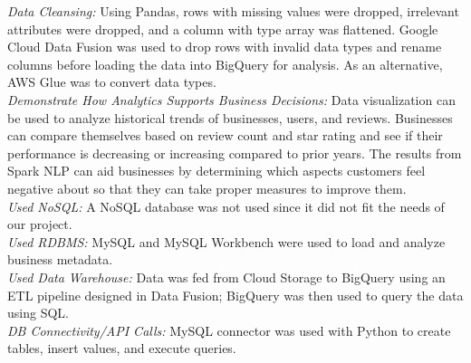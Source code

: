 \documentclass[11pt,journal,compsoc]{IEEEtran}
\begin{document}
\textit{Data Cleansing:} Using Pandas, rows with missing values were dropped, irrelevant attributes were dropped, and a column with type array was flattened. Google Cloud Data Fusion was used to drop rows with invalid data types and rename columns before loading the data into BigQuery for analysis. As an alternative, AWS Glue was to convert data types. \\
\textit{Demonstrate How Analytics Supports Business Decisions:} Data visualization can be used to analyze historical trends of businesses, users, and reviews. Businesses can compare themselves based on review count and star rating and see if their performance is decreasing or increasing compared to prior years. The results from Spark NLP can aid businesses by determining which aspects customers feel negative about so that they can take proper measures to improve them. \\
\textit{Used NoSQL:} A NoSQL database was not used since it did not fit the needs of our project. \\
\textit{Used RDBMS:} MySQL and MySQL Workbench were used to load and analyze business metadata. \\
\textit{Used Data Warehouse:} Data was fed from Cloud Storage to BigQuery using an ETL pipeline designed in Data Fusion; BigQuery was then used to query the data using SQL. \\
\textit{DB Connectivity/API Calls:} MySQL connector was used with Python to create tables, insert values, and execute queries.






\ifCLASSOPTIONcaptionsoff
  \newpage
\fi



\end{document}
